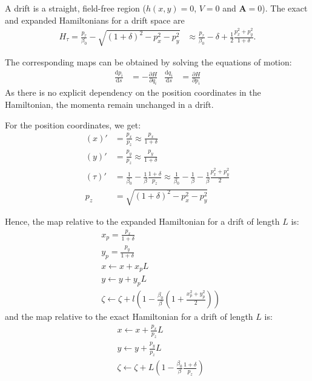 A drift is a straight, field-free region ($h(x,y)=0$, $V=0$ and
$\mathbf{A}=0$).  The exact and expanded Hamiltonians for a drift space are
\begin{align}
  H_\tau =
    \frac{p_\tau}{\beta_0}  - \sqrt{(1+\delta)^2 - p_x^2 - p_y^2}
  &\approx
    \frac{p_\tau}{\beta_0} - \delta + \frac{1}{2}\frac{p_x^2+p_y^2}{1+\delta}.
\end{align}

The corresponding maps can be obtained by solving the equations of motion:
\begin{align}
  \frac{\text{d} p_i}{\text{d}s} &= -\frac{\partial H}{\partial q_i} &
  \frac{\text{d} q_i}{\text{d}s} &=  \frac{\partial H}{\partial p_i}
\end{align}
As there is no explicit dependency on the position coordinates in the Hamiltonian, the
momenta remain unchanged in a drift.

For the position coordinates, we get:
\begin{align}
  \left(x\right)' &=
        \frac{p_x}{p_z}
        \approx \frac{p_x}{1+\delta} \\
  \left(y\right)' &=
        \frac{p_y}{p_z}
        \approx \frac{p_y}{1+\delta} \\
  \left(\tau\right)' &=
        \frac{1}{\beta_0} - \frac{1}{\beta}\frac{1+\delta}{p_z}
        \approx \frac{1}{\beta_0} - \frac{1}{\beta} - \frac{1}{\beta}
                \frac{p_x^2 + p_y^2}{2} \\
  p_z &=
        \sqrt{(1+\delta)^2 - p_x^2 - p_y^2}
\end{align}

Hence, the map relative to the expanded Hamiltonian for a drift of length $L$ is:
\begin{align}
  &x_p = \frac{p_x}{1+\delta} \\
  &y_p = \frac{p_y}{1+\delta}  \\
  &x  \leftarrow x + x_p L \\
  &y  \leftarrow y + y_p L \\
  &\zeta
    \leftarrow \zeta+
    l\left(1- \frac{\beta_0}{\beta}\left(1 + \frac{x_p^2+y_p^2}{2}\right)\right)
\end{align}
and the map relative to the exact Hamiltonian for a drift of length $L$ is:
\begin{align}
  &x \leftarrow x + \frac{p_x}{p_z} L\\
  &y \leftarrow y + \frac{p_y}{p_z} L\\
  &\zeta \leftarrow \zeta + L\left(
          1-\frac{\beta_0}{\beta}\frac{1+\delta}{p_z}
          \right)
\end{align}

